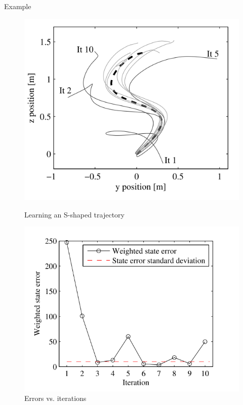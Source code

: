 \documentclass[handout]{beamer}
\begin{document}
\begin{frame}{Example}
\begin{figure}[!htb]
  \includegraphics[width=\linewidth]{ilc.png}
  \caption{Learning an S-shaped trajectory}
\endminipage\hfill
{}
  \includegraphics[width=\linewidth]{ilc_error.png}
  \caption{Errors vs. iterations}
\endminipage
\end{figure}
\end{frame}
%
\end{document}
